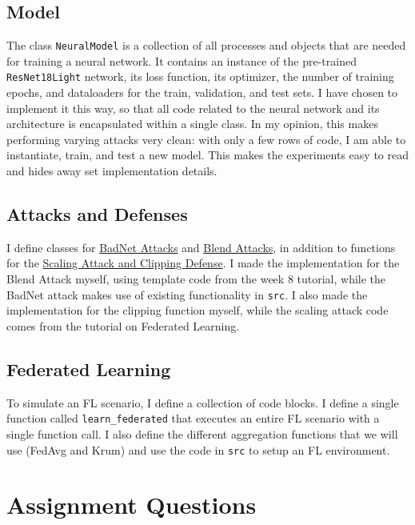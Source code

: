 \documentclass{article}
\begin{document}
\subsection{Model}
The class \texttt{NeuralModel} is a collection of all processes and objects that are needed for training a neural network.
It contains an instance of the pre-trained \texttt{ResNet18Light} network, its loss function, its optimizer, the number of training epochs, and dataloaders for the train, validation, and test sets.
I have chosen to implement it this way, so that all code related to the neural network and its architecture is encapsulated within a single class.
In my opinion, this makes performing varying attacks very clean: with only a few rows of code, I am able to instantiate, train, and test a new model.
This makes the experiments easy to read and hides away set implementation details.

\subsection{Attacks and Defenses}
I define classes for \href{https://arxiv.org/abs/1708.06733}{BadNet Attacks} and \href{https://arxiv.org/pdf/1712.05526}{Blend Attacks}, in addition to functions for the \href{http://proceedings.mlr.press/v108/bagdasaryan20a/bagdasaryan20a.pdf}{Scaling Attack and Clipping Defense}.
I made the implementation for the Blend Attack myself, using template code from the week 8 tutorial, while the BadNet attack makes use of existing functionality in \texttt{src}.
I also made the implementation for the clipping function myself, while the scaling attack code comes from the tutorial on Federated Learning.

\subsection{Federated Learning}
To simulate an FL scenario, I define a collection of code blocks.
I define a single function called \texttt{learn\_federated} that executes an entire FL scenario with a single function call.
I also define the different aggregation functions that we will use (FedAvg and Krum) and use the code in \texttt{src} to setup an FL environment.

\section{Assignment Questions}
        
\end{document}
